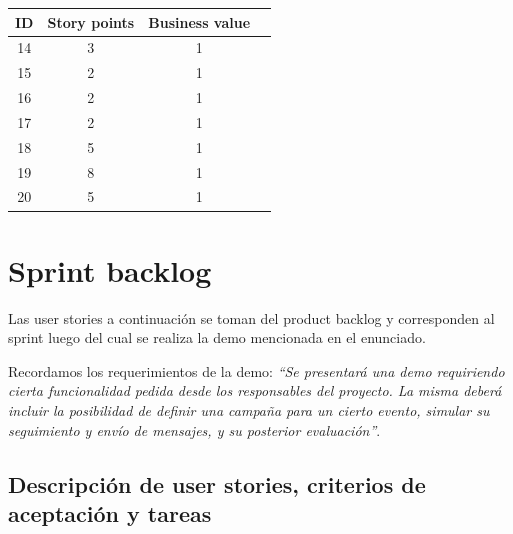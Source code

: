 \documentclass[a4paper, 10pt, twoside]{article}
\begin{document}
\begin{center}
\begin{tabular}{|c|c|c|c|}
\hline
ID & Story points & Business value\\
\hline
14 & 3 & 1\\
15 & 2 & 1\\
16 & 2 & 1\\
17 & 2 & 1\\
18 & 5 & 1\\
19 & 8 & 1\\
20 & 5 & 1\\
\hline
\end{tabular}
\end{center}



\section{Sprint backlog}

Las user stories a continuación se toman del product backlog y corresponden al sprint luego del cual se realiza la demo mencionada en el enunciado.

Recordamos los requerimientos de la demo: \emph{``Se presentará una demo requiriendo cierta funcionalidad pedida desde los responsables del proyecto. La misma deberá incluir la posibilidad de definir una campaña para un cierto evento, simular su seguimiento y envío de mensajes, y su posterior evaluación''}.


\subsection{Descripción de user stories, criterios de aceptación y tareas}
\end{document}
